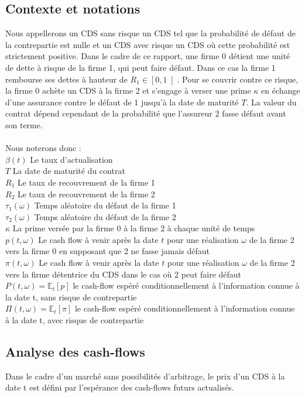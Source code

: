 \documentclass[a4paper]{article}
\begin{document}
\subsection{Contexte et notations}         %
Nous appellerons un CDS sans risque un CDS tel que la probabilité de défaut de la contrepartie est nulle et un CDS avec risque un CDS où cette probabilité est strictement positive.
 Dans le cadre de ce rapport, une firme 0 détient une unité de dette à risque de la firme 1, qui peut faire défaut.
 Dans ce cas la firme 1 rembourse ses dettes à hauteur de $R_{1} \in \left[ 0, 1 \right[$.
 Pour se couvrir contre ce risque, la firme 0 achète un CDS à la firme 2 et s'engage à verser une prime $\kappa$ en échange d'une assurance contre le défaut de 1 jusqu'à la date de maturité $T$.
 La valeur du contrat dépend cependant de la probabilité que l'assureur 2 fasse défaut avant son terme.
\\ \\
Nous noterons donc :\\
$\beta (t)$ Le taux d'actualisation\\
$T$ La date de maturité du contrat\\
$R_{1}$ Le taux de recouvrement de la firme 1\\
$R_{2}$ Le taux de recouvrement de la firme 2\\
$\tau_{1} (\omega)$ Temps aléatoire du défaut de la firme 1\\
$\tau_{2} (\omega)$ Temps aléatoire du défaut de la firme 2\\
$\kappa$ La prime versée par la firme 0 à la firme 2 à chaque unité de temps\\
$p (t, \omega)$ Le cash flow à venir après la date $t$ pour une réalisation $\omega$ de la firme 2 vers la firme 0 en supposant que 2 ne fasse jamais défaut\\
$\pi (t, \omega)$ Le cash flow à venir après la date $t$ pour une réalisation $\omega$ de la firme 2 vers la firme détentrice du CDS dans le cas où 2 peut faire défaut\\
$P (t, \omega) = \mathbb{E}_{t} [p]$ le cash-flow espéré conditionnellement à l'information connue à la date t, sans risque de contrepartie\\
$\Pi (t, \omega) = \mathbb{E}_{t} [\pi]$ le cash-flow espéré conditionnellement à l'information connue à la date t, avec risque de contrepartie


\subsection{Analyse des cash-flows}
Dans le cadre d'un marché sans possibilités d'arbitrage, le prix d'un CDS à la date t est défini par l'espérance des cash-flows futurs actualisés.
\end{document}
